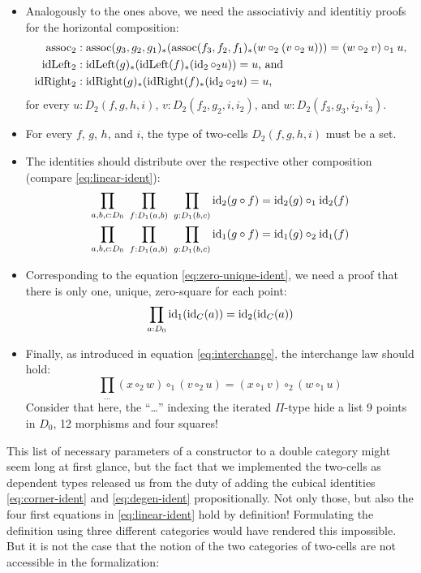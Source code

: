 \begin{defn}
\begin{itemize}
\item Analogously to the ones above, we need the associativiy and identitiy proofs
for the horizontal composition:
\begin{align*}
\assoch &: \assoc(g_3,g_2,g_1)_*(\assoc(f_3,f_2,f_1)_*(w \circ_2 (v \circ_2 u))) =
	(w \circ_2 v) \circ_1 u \text{,} \\ %
\idLefth &: \idLeft(g)_*(\idLeft(f)_*(\id_2 \circ_2 u)) = u \text{, and } \\
\idRighth &: \idRight(g)_*(\idRight(f)_*(\id_2 \circ_2 u) = u \text{,}
\end{align*}
for every $u : D_2(f,g,h,i)$, $v : D_2(f_2,g_2,i,i_2)$, and $w : D_2(f_3,g_3,i_2,i_3)$.
\item For every $f$, $g$, $h$, and $i$, the type of two-cells $D_2(f,g,h,i)$ must
be a set.
\item The identities should distribute over the respective other composition
(compare \ref{eq:linear-ident}):
\begin{align*}
\prod_{a,b,c : D_0} ~ \prod_{f : D_1(a,b)} ~ \prod_{g : D_1(b,c)}
	\operatorname{id}_2 (g \circ f) = \operatorname{id}_2(g) \circ_1 \operatorname{id}_2(f) \\
\prod_{a,b,c : D_0} ~ \prod_{f : D_1(a,b)} ~ \prod_{g : D_1(b,c)}
	\operatorname{id}_1 (g \circ f) = \operatorname{id}_1(g) \circ_2 \operatorname{id}_1(f)
\end{align*}
\item Corresponding to the equation \ref{eq:zero-unique-ident}, we need a proof
that there is only one, unique, zero-square for each point:
\begin{equation*}
\prod_{a : D_0} \operatorname{id}_1(\operatorname{id}_C(a)) = \operatorname{id}_2(\operatorname{id}_C(a))
\end{equation*}
\item Finally, as introduced in equation \ref{eq:interchange}, the interchange
law should hold:
\begin{equation*}
\prod_{\ldots} (x \circ_2 w) \circ_1 (v \circ_2 u) = (x \circ_1 v) \circ_2 (w \circ_1 u)
\end{equation*}
Consider that here, the ``\ldots'' indexing the iterated $\Pi$-type hide a list
9 points in $D_0$, 12 morphisms and four squares!
\end{itemize}
\end{defn}

This list of necessary parameters of a constructor to a double category might seem long at first
glance, but the fact that we implemented the two-cells as dependent types
released us from the duty of adding the cubical identities \ref{eq:corner-ident}
and \ref{eq:degen-ident} propositionally.
Not only those, but also the four first equations in \ref{eq:linear-ident} hold
by definition!
Formulating the definition using three different categories would have rendered
this impossible.
But it is not the case that the notion of the two categories of two-cells are not
accessible in the formalization:

